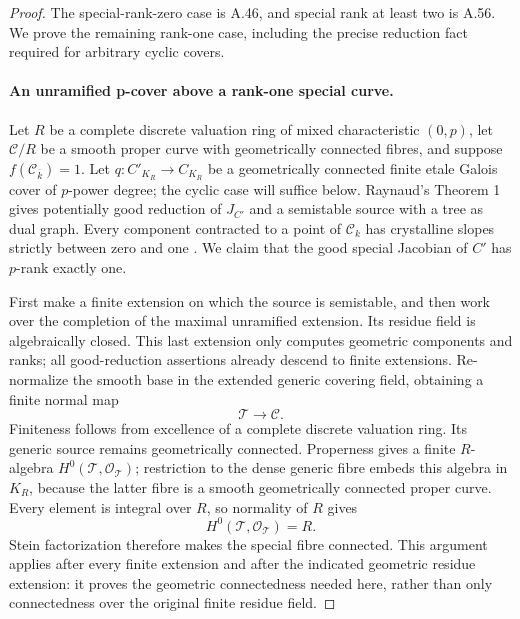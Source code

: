 \begin{proof}
The special-rank-zero case is A.46, and special rank at least
two is A.56. We prove the remaining rank-one case, including
the precise reduction fact required for arbitrary cyclic covers.

\paragraph{An unramified p-cover above a rank-one special curve.}
Let \(R\) be a complete discrete valuation ring of mixed
characteristic \((0,p)\), let \(\mathcal C/R\) be a smooth
proper curve with geometrically connected fibres, and suppose
\(f(\mathcal C_{\overline k})=1\). Let
\(q:C'_{K_R}\to C_{K_R}\) be a geometrically connected finite
etale Galois cover of \(p\)-power degree; the cyclic case will
suffice below. Raynaud's Theorem 1 gives potentially good
reduction of \(J_{C'}\) and a semistable source with a tree
as dual graph. Every component contracted to a point of
\(\mathcal C_k\) has crystalline slopes strictly between
zero and one \cite[Theorem 1, printed p.179]{fghRaynaud1990Pgroups}.
We claim that the good special Jacobian of \(C'\) has
\(p\)-rank exactly one.

First make a finite extension on which the source is semistable,
and then work over the completion of the maximal unramified
extension. Its residue field is algebraically closed. This
last extension only computes geometric components and ranks;
all good-reduction assertions already descend to finite
extensions. Re-normalize the smooth base in the extended
generic covering field, obtaining a finite normal map
\[
                   \mathcal T\longrightarrow\mathcal C.
                                                        \tag{A.57.2}
\]
Finiteness follows from excellence of a complete discrete
valuation ring. Its generic source remains geometrically
connected. Properness gives a finite \(R\)-algebra
\(H^0(\mathcal T,\mathcal O_{\mathcal T})\); restriction to
the dense generic fibre embeds this algebra in \(K_R\),
because the latter fibre is a smooth geometrically connected
proper curve. Every element is integral over \(R\), so normality
of \(R\) gives
\[
                  H^0(\mathcal T,\mathcal O_{\mathcal T})=R.
                                                        \tag{A.57.3}
\]
Stein factorization therefore makes the special fibre connected.
This argument applies after every finite extension and after
the indicated geometric residue extension: it proves the
geometric connectedness needed here, rather than only
connectedness over the original finite residue field.


\end{proof}
